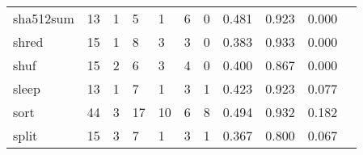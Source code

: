 \begin{longtable}{lp{1.2cm}p{1.2cm}p{1.2cm}p{1.2cm}p{1.2cm}p{1.2cm}p{1.2cm}p{1.2cm}p{1.2cm}p{1.2cm}}
sha512sum &                                    13 &                                                  1 &                                                  5 &                                                  1 &                                                  6 &                                                  0 &                                         0.481 &                                              0.923 &                                              0.000 \\
shred     &                                    15 &                                                  1 &                                                  8 &                                                  3 &                                                  3 &                                                  0 &                                         0.383 &                                              0.933 &                                              0.000 \\
shuf      &                                    15 &                                                  2 &                                                  6 &                                                  3 &                                                  4 &                                                  0 &                                         0.400 &                                              0.867 &                                              0.000 \\
sleep     &                                    13 &                                                  1 &                                                  7 &                                                  1 &                                                  3 &                                                  1 &                                         0.423 &                                              0.923 &                                              0.077 \\
sort      &                                    44 &                                                  3 &                                                 17 &                                                 10 &                                                  6 &                                                  8 &                                         0.494 &                                              0.932 &                                              0.182 \\
split     &                                    15 &                                                  3 &                                                  7 &                                                  1 &                                                  3 &                                                  1 &                                         0.367 &                                              0.800 &                                              0.067 \\

\end{longtable}
